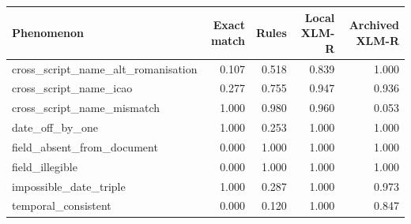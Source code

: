 \begin{tabular}{lrrrr}
\toprule
Phenomenon & Exact match & Rules & Local XLM-R & Archived XLM-R \\
\midrule
cross\_script\_name\_alt\_romanisation & 0.107 & 0.518 & 0.839 & 1.000 \\
cross\_script\_name\_icao & 0.277 & 0.755 & 0.947 & 0.936 \\
cross\_script\_name\_mismatch & 1.000 & 0.980 & 0.960 & 0.053 \\
date\_off\_by\_one & 1.000 & 0.253 & 1.000 & 1.000 \\
field\_absent\_from\_document & 0.000 & 1.000 & 1.000 & 1.000 \\
field\_illegible & 0.000 & 1.000 & 1.000 & 1.000 \\
impossible\_date\_triple & 1.000 & 0.287 & 1.000 & 0.973 \\
temporal\_consistent & 0.000 & 0.120 & 1.000 & 0.847 \\
\bottomrule
\end{tabular}
